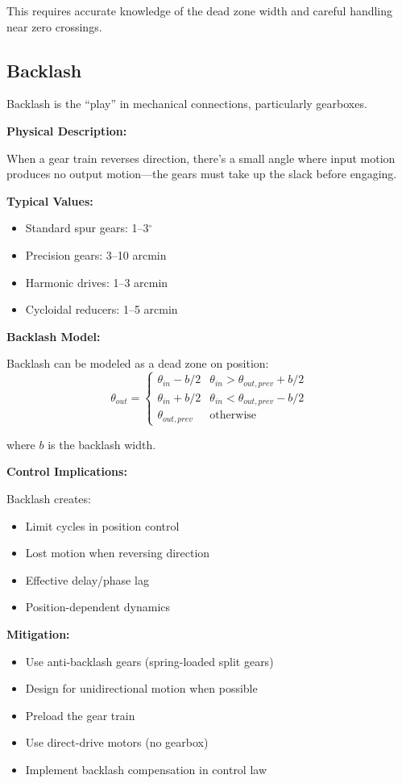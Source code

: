 This requires accurate knowledge of the dead zone width and careful handling near zero crossings.

\subsection{Backlash}

Backlash is the ``play'' in mechanical connections, particularly gearboxes.

\textbf{Physical Description:}

When a gear train reverses direction, there's a small angle where input motion produces no output motion---the gears must take up the slack before engaging.

\textbf{Typical Values:}
\begin{itemize}
    \item Standard spur gears: 1--3$^\circ$
    \item Precision gears: 3--10 arcmin
    \item Harmonic drives: 1--3 arcmin
    \item Cycloidal reducers: 1--5 arcmin
\end{itemize}

\textbf{Backlash Model:}

Backlash can be modeled as a dead zone on position:
\begin{equation}
    \theta_{out} = \begin{cases}
        \theta_{in} - b/2 & \theta_{in} > \theta_{out,prev} + b/2 \\
        \theta_{in} + b/2 & \theta_{in} < \theta_{out,prev} - b/2 \\
        \theta_{out,prev} & \text{otherwise}
    \end{cases}
\end{equation}

where $b$ is the backlash width.

\textbf{Control Implications:}

Backlash creates:
\begin{itemize}
    \item Limit cycles in position control
    \item Lost motion when reversing direction
    \item Effective delay/phase lag
    \item Position-dependent dynamics
\end{itemize}

\textbf{Mitigation:}
\begin{itemize}
    \item Use anti-backlash gears (spring-loaded split gears)
    \item Design for unidirectional motion when possible
    \item Preload the gear train
    \item Use direct-drive motors (no gearbox)
    \item Implement backlash compensation in control law
\end{itemize}

